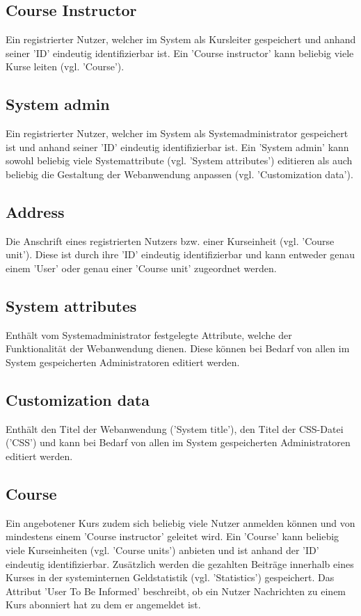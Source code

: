 \subsection{Course Instructor}
Ein registrierter Nutzer, welcher im System als Kursleiter gespeichert und anhand seiner 'ID' eindeutig identifizierbar ist. Ein 'Course instructor' kann beliebig viele Kurse leiten (vgl. 'Course').

\subsection{System admin}
Ein registrierter Nutzer, welcher im System als Systemadministrator gespeichert ist und anhand seiner 'ID' eindeutig identifizierbar ist. Ein 'System admin' kann sowohl beliebig viele Systemattribute (vgl. 'System attributes') editieren als auch beliebig die Gestaltung der Webanwendung anpassen (vgl. 'Customization data').

\subsection{Address}
Die Anschrift eines registrierten Nutzers bzw. einer Kurseinheit (vgl. 'Course unit'). Diese ist durch ihre 'ID' eindeutig identifizierbar und kann entweder genau einem 'User' oder genau einer 'Course unit' zugeordnet werden.

\subsection{System attributes}
Enthält vom Systemadministrator festgelegte Attribute, welche der Funktionalität der Webanwendung dienen. Diese können bei Bedarf von allen im System gespeicherten Administratoren editiert werden.

\subsection{Customization data}
Enthält den Titel der Webanwendung ('System title'), den Titel der CSS-Datei ('CSS') und kann bei Bedarf von allen im System gespeicherten Administratoren editiert werden.

\subsection{Course}
Ein angebotener Kurs zudem sich beliebig viele Nutzer anmelden können und von mindestens einem 'Course instructor' geleitet wird. Ein 'Course' kann beliebig viele Kurseinheiten (vgl. 'Course units') anbieten und ist anhand der 'ID' eindeutig identifizierbar. Zusätzlich werden die gezahlten Beiträge innerhalb eines Kurses in der systeminternen Geldstatistik (vgl. 'Statistics') gespeichert. Das Attribut 'User To Be Informed' beschreibt, ob ein Nutzer Nachrichten zu einem Kurs abonniert hat zu dem er angemeldet ist.

